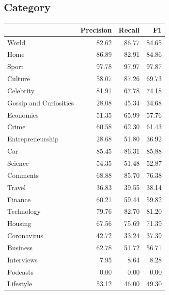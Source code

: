 \subsection{Category}
\label{sec:final-model-performance-on-category}
\begin{table}[h]
    \centering\footnotesize\sf
    \begin{tabular}{lrrr}
        \toprule
        {}                     & Precision & Recall & F1    \\
        \midrule
        World                  & 82.62     & 86.77  & 84.65 \\
        Home                   & 86.89     & 82.91  & 84.86 \\
        Sport                  & 97.78     & 97.97  & 97.87 \\
        Culture                & 58.07     & 87.26  & 69.73 \\
        Celebrity              & 81.91     & 67.78  & 74.18 \\
        Gossip and Curiosities & 28.08     & 45.34  & 34.68 \\
        Economics              & 51.35     & 65.99  & 57.76 \\
        Crime                  & 60.58     & 62.30  & 61.43 \\
        Entrepreneurship       & 28.68     & 51.80  & 36.92 \\
        Car                    & 85.45     & 86.31  & 85.88 \\
        Science                & 54.35     & 51.48  & 52.87 \\
        Comments               & 68.88     & 85.70  & 76.38 \\
        Travel                 & 36.83     & 39.55  & 38.14 \\
        Finance                & 60.21     & 59.44  & 59.82 \\
        Technology             & 79.76     & 82.70  & 81.20 \\
        Housing                & 67.56     & 75.69  & 71.39 \\
        Coronavirus            & 42.72     & 33.24  & 37.39 \\
        Business               & 62.78     & 51.72  & 56.71 \\
        Interviews             & 7.95      & 8.64   & 8.28  \\
        Podcasts               & 0.00      & 0.00   & 0.00  \\
        Lifestyle              & 53.12     & 46.00  & 49.30 \\

\end{tabular}
\end{table}
